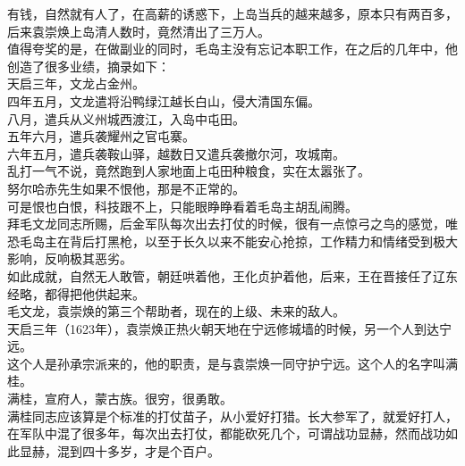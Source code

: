 \begin{multicols}{\theparacolNo}
有钱，自然就有人了，在高薪的诱惑下，上岛当兵的越来越多，原本只有两百多，后来袁崇焕上岛清人数时，竟然清出了三万人。\\

值得夸奖的是，在做副业的同时，毛岛主没有忘记本职工作，在之后的几年中，他创造了很多业绩，摘录如下：\\

天启三年，文龙占金州。\\

四年五月，文龙遣将沿鸭绿江越长白山，侵大清国东偏。\\

八月，遣兵从义州城西渡江，入岛中屯田。\\

五年六月，遣兵袭耀州之官屯寨。\\

六年五月，遣兵袭鞍山驿，越数日又遣兵袭撤尔河，攻城南。\\

乱打一气不说，竟然跑到人家地面上屯田种粮食，实在太嚣张了。\\

努尔哈赤先生如果不恨他，那是不正常的。\\

可是恨也白恨，科技跟不上，只能眼睁睁看着毛岛主胡乱闹腾。\\

拜毛文龙同志所赐，后金军队每次出去打仗的时候，很有一点惊弓之鸟的感觉，唯恐毛岛主在背后打黑枪，以至于长久以来不能安心抢掠，工作精力和情绪受到极大影响，反响极其恶劣。\\

如此成就，自然无人敢管，朝廷哄着他，王化贞护着他，后来，王在晋接任了辽东经略，都得把他供起来。\\

毛文龙，袁崇焕的第三个帮助者，现在的上级、未来的敌人。\\

天启三年（1623年），袁崇焕正热火朝天地在宁远修城墙的时候，另一个人到达宁远。\\

这个人是孙承宗派来的，他的职责，是与袁崇焕一同守护宁远。这个人的名字叫满桂。\\

满桂，宣府人，蒙古族。很穷，很勇敢。\\

满桂同志应该算是个标准的打仗苗子，从小爱好打猎。长大参军了，就爱好打人，在军队中混了很多年，每次出去打仗，都能砍死几个，可谓战功显赫，然而战功如此显赫，混到四十多岁，才是个百户。\\


\end{multicols}
